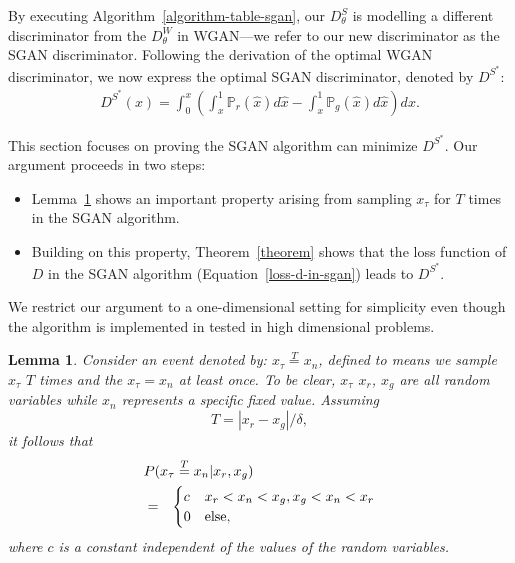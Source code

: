 \documentclass[letterpaper]{article} %
\begin{document}
By executing Algorithm~\ref{algorithm-table-sgan}, our $D_{\theta}^S$ is modelling a different discriminator from the $D_{\theta}^W$ in WGAN---we refer to our new discriminator as the SGAN discriminator. Following the derivation of the optimal WGAN discriminator, we now express the optimal SGAN discriminator, denoted by $D^{S^\ast}$:
\begin{eqnarray}\label{opt-d-sgan}
    D^{S^\ast}(x) = \int^x_{0} ( \int_{x}^{1} \mathbb{P}_r(\hat{x}) d \hat{x} - \int_{x}^{1} \mathbb{P}_g(\hat{x}) d \hat{x} ) d x. \nonumber
\end{eqnarray}

This section focuses on proving the SGAN algorithm can minimize $D^{S^\ast}$. Our argument proceeds in two steps:
\begin{itemize}
    \item Lemma~\ref{lemma} shows an important property arising from sampling $x_\tau$ for $T$ times in the SGAN algorithm.
    \item Building on this property, Theorem~\ref{theorem} shows that the loss function of $D$ in the SGAN algorithm (Equation~\eqref{loss-d-in-sgan}) leads to $D^{S^\ast}$.
\end{itemize}
We restrict our argument to a one-dimensional setting for simplicity even though the algorithm is implemented in tested in high dimensional problems.

\newtheorem{theorem}{Theorem}
\newtheorem{lemma}{Lemma}

\begin{lemma}
Consider an event denoted by: $x_\tau\overset{T}{=}x_n$, defined to means we sample $x_\tau$ $T$ times and the $x_\tau = x_n$ at least once. To be clear, $x_\tau$ $x_r$, $x_g$ are all random variables while $x_n$ represents a specific fixed value. Assuming
\begin{equation}\label{T}
  T = |x_r-x_g|/{\delta},
\end{equation}
it follows that
\begin{eqnarray}
\lefteqn{P(x_\tau\overset{T}{=}x_n|x_r,x_g)} \\
    &=&
    \begin{cases}
        c &\mbox{$x_r<x_n<x_g,x_g<x_n<x_r$}\\
        0 &\mbox{else},
    \end{cases}
\end{eqnarray}
where $c$ is a constant independent of the values of the random variables.
\label{lemma}
\end{lemma}
\end{document}
